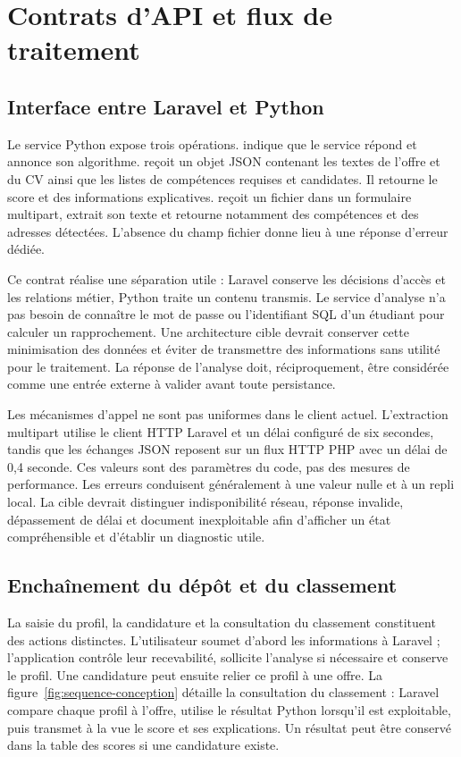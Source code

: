 \section{Contrats d'API et flux de traitement}

\subsection{Interface entre Laravel et Python}

Le service Python expose trois opérations.  indique que le service répond et annonce son algorithme.  reçoit un objet JSON contenant les textes de l'offre et du CV ainsi que les listes de compétences requises et candidates. Il retourne le score et des informations explicatives.  reçoit un fichier dans un formulaire multipart, extrait son texte et retourne notamment des compétences et des adresses détectées. L'absence du champ fichier donne lieu à une réponse d'erreur dédiée.

Ce contrat réalise une séparation utile : Laravel conserve les décisions d'accès et les relations métier, Python traite un contenu transmis. Le service d'analyse n'a pas besoin de connaître le mot de passe ou l'identifiant SQL d'un étudiant pour calculer un rapprochement. Une architecture cible devrait conserver cette minimisation des données et éviter de transmettre des informations sans utilité pour le traitement. La réponse de l'analyse doit, réciproquement, être considérée comme une entrée externe à valider avant toute persistance.

Les mécanismes d'appel ne sont pas uniformes dans le client actuel. L'extraction multipart utilise le client HTTP Laravel et un délai configuré de six secondes, tandis que les échanges JSON reposent sur un flux HTTP PHP avec un délai de 0,4 seconde. Ces valeurs sont des paramètres du code, pas des mesures de performance. Les erreurs conduisent généralement à une valeur nulle et à un repli local. La cible devrait distinguer indisponibilité réseau, réponse invalide, dépassement de délai et document inexploitable afin d'afficher un état compréhensible et d'établir un diagnostic utile.

\subsection{Enchaînement du dépôt et du classement}

La saisie du profil, la candidature et la consultation du classement constituent des actions distinctes. L'utilisateur soumet d'abord les informations à Laravel ; l'application contrôle leur recevabilité, sollicite l'analyse si nécessaire et conserve le profil. Une candidature peut ensuite relier ce profil à une offre. La figure~\ref{fig:sequence-conception} détaille la consultation du classement : Laravel compare chaque profil à l'offre, utilise le résultat Python lorsqu'il est exploitable, puis transmet à la vue le score et ses explications. Un résultat peut être conservé dans la table des scores si une candidature existe.

